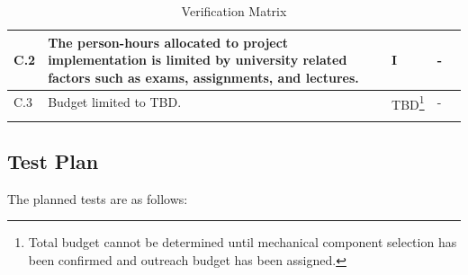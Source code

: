 \documentclass[a4paper,12pt,twoside]{article}
\begin{document}
\begin{longtable}[]{|m{}| m{} |m{} |m{}|m{}|}
C.2  & The person-hours allocated to project implementation is limited by university related factors such as exams, assignments, and lectures.                                 &      I        & -            &        \\ \hline
C.3  & Budget limited to TBD.                                                                                                                                                  &      TBD\footnote{Total budget cannot be determined until mechanical component selection has been confirmed and outreach budget has been assigned.}        & -            &        \\ \hline

\caption{Verification Matrix}
\label{tab:var-mat}
\end{longtable}
\raggedbottom
\pagebreak
\subsection{Test Plan}

The planned tests are as follows:
\end{document}

